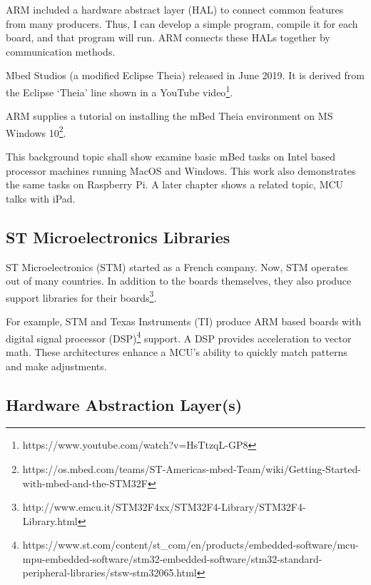 \documentclass{article}
\begin{document}
ARM included a hardware abstract layer (HAL) to connect common features from many producers. Thus, I can develop a simple program, compile it for each board, and that program will run. ARM connects these HALs together by communication methods.

Mbed Studios (a modified Eclipse Theia) released in June 2019. It is derived from the Eclipse ‘Theia’ line shown in a YouTube video\footnote{https://www.youtube.com/watch?v=HsTtzqL-GP8}. 



ARM supplies a tutorial on installing the mBed Theia environment on MS Windows 10\footnote{https://os.mbed.com/teams/ST-Americas-mbed-Team/wiki/Getting-Started-with-mbed-and-the-STM32F}.  

This background topic shall show examine basic mBed tasks on Intel based processor machines running MacOS and Windows.  This work also demonstrates the same tasks on Raspberry Pi.  A later chapter shows a related topic, MCU talks with iPad. 


\subsection{ST Microelectronics Libraries} %
\label{sub:st_microelectronics_libraries}

ST Microelectronics (STM) started as a French company. Now, STM operates out of many countries. In addition to the boards themselves, they also produce support libraries for their boards\footnote{http://www.emcu.it/STM32F4xx/STM32F4-Library/STM32F4-Library.html}. 

For example, STM and Texas Instruments (TI) produce ARM based boards with digital signal processor (DSP)\footnote{https://www.st.com/content/st\_com/en/products/embedded-software/mcu-mpu-embedded-software/stm32-embedded-software/stm32-standard-peripheral-libraries/stsw-stm32065.html} support.  A DSP provides acceleration to vector math.  These architectures enhance a MCU's ability to quickly match patterns and make adjustments.







\subsection{Hardware Abstraction Layer(s)} %
\label{sub:hardware_abstraction_layer_s}
\end{document}
